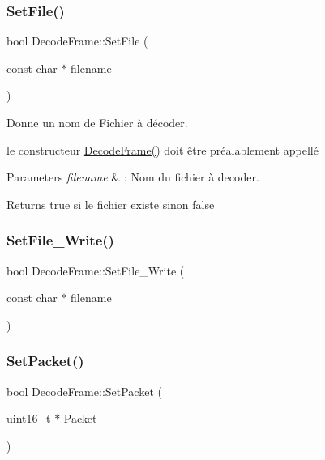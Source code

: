 \subsubsection{\texorpdfstring{Set\+File()}{SetFile()}}
{\footnotesize\ttfamily bool Decode\+Frame\+::\+Set\+File (\begin{DoxyParamCaption}\item[{const char $\ast$}]{filename }\end{DoxyParamCaption})}



Donne un nom de Fichier à décoder. 

le constructeur \hyperlink{classDecodeFrame_ae6ae88ee29bcaff936e7c7b2380f96b4}{Decode\+Frame()} doit être préalablement appellé 
\begin{DoxyParams}{Parameters}
{\em filename} & \+: Nom du fichier à decoder. \\
\hline
\end{DoxyParams}
\begin{DoxyReturn}{Returns}
true si le fichier existe sinon false 
\end{DoxyReturn}
\mbox{\label{classDecodeFrame_abe7a0f6d2223aa6a06da02745f2f624b}} 
\subsubsection{\texorpdfstring{Set\+File\+\_\+\+Write()}{SetFile\_Write()}}
{\footnotesize\ttfamily bool Decode\+Frame\+::\+Set\+File\+\_\+\+Write (\begin{DoxyParamCaption}\item[{const char $\ast$}]{filename }\end{DoxyParamCaption})}

\mbox{\label{classDecodeFrame_a84aaba0024f0e2c959c83db47a4e6cd1}} 
\subsubsection{\texorpdfstring{Set\+Packet()}{SetPacket()}}
{\footnotesize\ttfamily bool Decode\+Frame\+::\+Set\+Packet (\begin{DoxyParamCaption}\item[{uint16\+\_\+t $\ast$}]{Packet }\end{DoxyParamCaption})}



